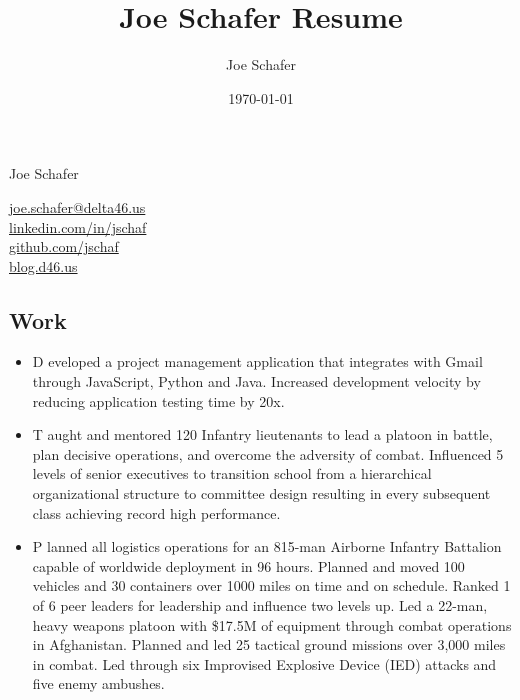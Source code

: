 \documentclass[letterpaper]{jschaf-resume}
\title{Joe Schafer Resume}
\author{Joe Schafer}
\date{\today}
\makeatletter
\newcommand{\resitem}[1]{\item #1 \vspace{-2pt}}
\newcommand*{\emailLink}{\href{mailto:joe.schafer@delta46.us}{joe.schafer@delta46.us}}
\newcommand*{\linkedInLink}{\href{http://linkedin.com/in/jschaf}{linkedin.com/in/jschaf}}
\newcommand*{\githubLink}{\href{http://github.com/jschaf}{github.com/jschaf}}
\newcommand*{\blogLink}{\href{http://blog.d46.us}{blog.d46.us}}
\makeatother
\begin{document}

\setlength{\tabcolsep}{18pt}

\begin{paracol}{2}
{\LARGE Joe Schafer}

\switchcolumn

\emailLink\\
\linkedInLink\\
\githubLink\\
\blogLink\\

\end{paracol}


\begin{paracol}{2}

\section{Work}

\begin{itemize}
  \resitem Developed a project management application that integrates with Gmail
  through JavaScript, Python and Java.  Increased development velocity by
  reducing application testing time by 20x.
\end{itemize}

\begin{itemize}
  \resitem Taught and mentored 120 Infantry lieutenants to lead a platoon in
  battle, plan decisive operations, and overcome the adversity of combat.
  Influenced 5 levels of senior executives to transition school from a
  hierarchical organizational structure to committee design resulting in every
  subsequent class achieving record high performance.
\end{itemize}

\begin{itemize}
  \resitem Planned all logistics operations for an 815-man Airborne Infantry
  Battalion capable of worldwide deployment in 96 hours.  Planned and moved 100
  vehicles and 30 containers over 1000 miles on time and on schedule.  Ranked
  1 of 6 peer leaders for leadership and influence two levels up.  Led a
  22-man, heavy weapons platoon with \$17.5M of equipment through combat
  operations in Afghanistan.  Planned and led 25 tactical ground missions over
  3,000 miles in combat.  Led through six Improvised Explosive Device (IED)
  attacks and five enemy ambushes.
\end{itemize}


\end{paracol}
\end{document}
